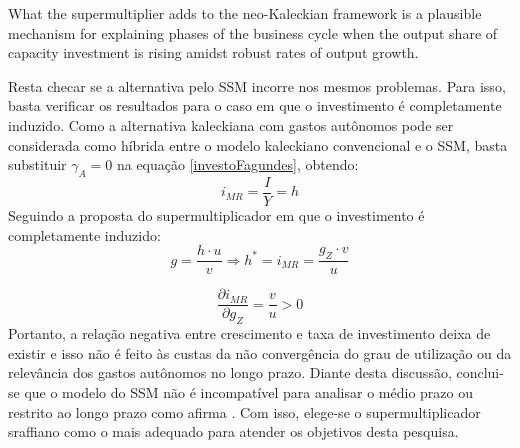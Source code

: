 \begin{citacao}
	What the supermultiplier adds to the neo-Kaleckian framework is a plausible mechanism for explaining phases
	of the business cycle when the output share of capacity investment is rising amidst robust rates of output growth. \cite[p.~9]{fiebiger_trend_2017}
\end{citacao}

Resta checar se a alternativa pelo SSM incorre nos mesmos problemas. Para isso, basta verificar os resultados para o caso em que o investimento é completamente induzido. Como a alternativa kaleckiana com gastos autônomos pode ser considerada como híbrida entre o modelo kaleckiano convencional e o SSM, basta substituir $\gamma_A = 0$ na equação \ref{investoFagundes}, obtendo:
$$
i_{MR} = \frac{I}{Y} =  h
$$
Seguindo a proposta do supermultiplicador em que o investimento é completamente induzido:
$$
g = \frac{h\cdot u}{v} \Rightarrow h^* = i_{MR} = \frac{g_Z\cdot v}{u}
$$

$$
\frac{\partial i_{MR}}{\partial g_Z} = \frac{v}{u} > 0
$$
Portanto, a relação negativa entre crescimento e taxa de investimento deixa de existir e isso não é feito às custas da não convergência do grau de utilização ou da relevância dos gastos autônomos no longo prazo. 
Diante desta discussão, conclui-se que o modelo do SSM não é incompatível para analisar o médio prazo ou restrito ao longo prazo como afirma \textcite{nikiforos_comments_2018}. Com isso, elege-se o supermultiplicador sraffiano como o mais adequado para atender os objetivos desta pesquisa. 





